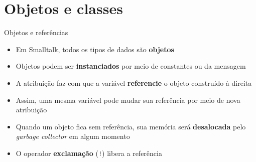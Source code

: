 \section{Objetos e classes}

\begin{frame}[fragile]{Objetos e referências}

    \begin{itemize}
        \item Em Smalltalk, todos os tipos de dados são \textbf{objetos}

        \item Objetos podem ser \textbf{instanciados} por meio de constantes ou da mensagem


        \item A atribuição faz com que a variável \textbf{referencie} o objeto construído à
            direita

        \item Assim, uma mesma variável pode mudar sua referência por meio de nova 
            atribuição


        \item Quando um objeto fica sem referência, sua memória será \textbf{desalocada} pelo
            \textit{garbage collector} em algum momento

        \item O operador \textbf{exclamação} (\texttt{!}) libera a referência

    \end{itemize}

\end{frame}

